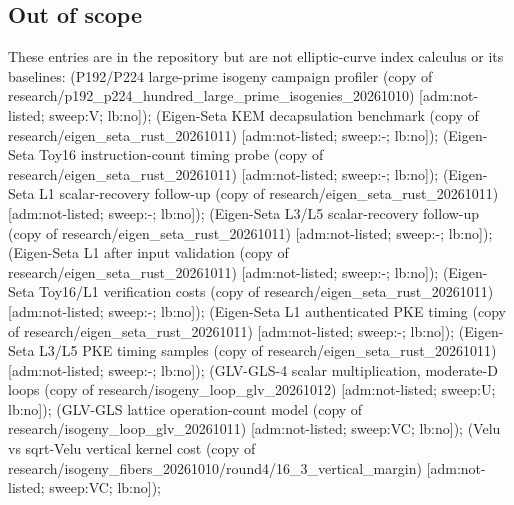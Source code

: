 \subsection{Out of scope}
These entries are in the repository but are not elliptic-curve index calculus or its baselines:  (P192/\allowbreak{}P224 large-prime isogeny campaign profiler (copy of research/\allowbreak{}p192\_\allowbreak{}p224\_\allowbreak{}hundred\_\allowbreak{}large\_\allowbreak{}prime\_\allowbreak{}isogenies\_\allowbreak{}20261010) [adm:not-listed; sweep:V; lb:no]);  (Eigen-Seta KEM decapsulation benchmark (copy of research/\allowbreak{}eigen\_\allowbreak{}seta\_\allowbreak{}rust\_\allowbreak{}20261011) [adm:not-listed; sweep:-; lb:no]);  (Eigen-Seta Toy16 instruction-count timing probe (copy of research/\allowbreak{}eigen\_\allowbreak{}seta\_\allowbreak{}rust\_\allowbreak{}20261011) [adm:not-listed; sweep:-; lb:no]);  (Eigen-Seta L1 scalar-recovery follow-up (copy of research/\allowbreak{}eigen\_\allowbreak{}seta\_\allowbreak{}rust\_\allowbreak{}20261011) [adm:not-listed; sweep:-; lb:no]);  (Eigen-Seta L3/\allowbreak{}L5 scalar-recovery follow-up (copy of research/\allowbreak{}eigen\_\allowbreak{}seta\_\allowbreak{}rust\_\allowbreak{}20261011) [adm:not-listed; sweep:-; lb:no]);  (Eigen-Seta L1 after input validation (copy of research/\allowbreak{}eigen\_\allowbreak{}seta\_\allowbreak{}rust\_\allowbreak{}20261011) [adm:not-listed; sweep:-; lb:no]);  (Eigen-Seta Toy16/\allowbreak{}L1 verification costs (copy of research/\allowbreak{}eigen\_\allowbreak{}seta\_\allowbreak{}rust\_\allowbreak{}20261011) [adm:not-listed; sweep:-; lb:no]);  (Eigen-Seta L1 authenticated PKE timing (copy of research/\allowbreak{}eigen\_\allowbreak{}seta\_\allowbreak{}rust\_\allowbreak{}20261011) [adm:not-listed; sweep:-; lb:no]);  (Eigen-Seta L3/\allowbreak{}L5 PKE timing samples (copy of research/\allowbreak{}eigen\_\allowbreak{}seta\_\allowbreak{}rust\_\allowbreak{}20261011) [adm:not-listed; sweep:-; lb:no]);  (GLV-GLS-4 scalar multiplication, moderate-D loops (copy of research/\allowbreak{}isogeny\_\allowbreak{}loop\_\allowbreak{}glv\_\allowbreak{}20261012) [adm:not-listed; sweep:U; lb:no]);  (GLV-GLS lattice operation-count model (copy of research/\allowbreak{}isogeny\_\allowbreak{}loop\_\allowbreak{}glv\_\allowbreak{}20261011) [adm:not-listed; sweep:VC; lb:no]);  (Velu vs sqrt-Velu vertical kernel cost (copy of research/\allowbreak{}isogeny\_\allowbreak{}fibers\_\allowbreak{}20261010/\allowbreak{}round4/\allowbreak{}16\_\allowbreak{}3\_\allowbreak{}vertical\_\allowbreak{}margin) [adm:not-listed; sweep:VC; lb:no]);  
